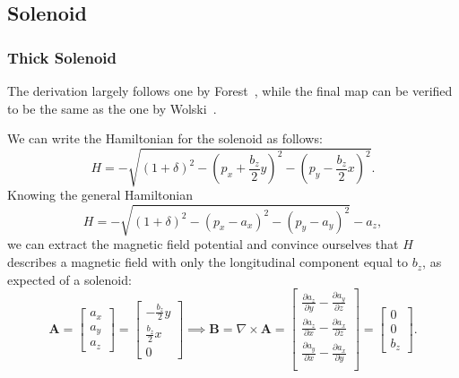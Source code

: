 \subsection{Solenoid}

\subsubsection{Thick Solenoid}

The derivation largely follows one by Forest~\cite{forest99}, while the final map can be verified to be the same as the one by Wolski~\cite{wolski2014beam}.

We can write the Hamiltonian for the solenoid as follows:
\[
  H = -\sqrt{(1 + \delta)^2 - (p_x + \frac{b_z}{2}y)^2 - (p_y - \frac{b_z}{2}x)^2}.
\]
Knowing the general Hamiltonian
\[
  H = -\sqrt{(1 + \delta)^2 - (p_x - a_x)^2 - (p_y - a_y)^2} - a_z,
\]
we can extract the magnetic field potential and convince ourselves that $H$ describes a magnetic field with only the longitudinal component equal to $b_z$, as expected of a solenoid:
\[
  \mathbf{A} =
  \begin{bmatrix}
    a_x \\ a_y \\ a_z
  \end{bmatrix}
  = \begin{bmatrix}
    -\frac{b_z}{2}y\\
    \frac{b_z}{2}x\\
    0
  \end{bmatrix}
  \implies
  \mathbf{B} = \nabla \times \mathbf{A}
  = \begin{bmatrix}
    \frac{\partial a_z}{\partial y} - \frac{\partial a_y}{\partial z}\\
    \frac{\partial a_z}{\partial x} - \frac{\partial a_x}{\partial z}\\
    \frac{\partial a_y}{\partial x} - \frac{\partial a_x}{\partial y}\\
  \end{bmatrix}
  = \begin{bmatrix}
    0\\
    0\\
    b_z
  \end{bmatrix}.
\]

